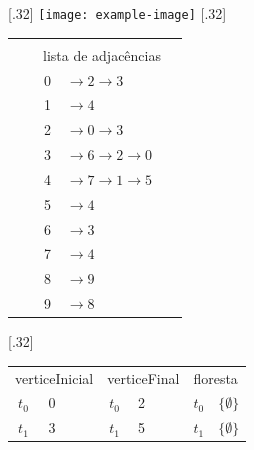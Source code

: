 \documentclass[12pt]{article}
\begin{document}
\begin{figure}
\centering
\subcaptionbox{}[.32\textwidth]
  {\resizebox{0.3\textwidth}{!}
		  {\texttt{[image: example-image]}}}
\subcaptionbox{}[.32\textwidth]
  {\resizebox{0.2122\textwidth}{!}
		  {\begin{tabular}{llcllllllll}
 &  & \multicolumn{1}{l}{} &  &  &  &  &  &  &  &  \\
 &  & \multicolumn{8}{l}{lista de adjacências} &  \\ \cline{3-3}
 & \multicolumn{1}{l|}{} & \multicolumn{1}{c|}{0} & \multicolumn{7}{l}{$\to2\to3$} &  \\ \cline{3-3}
 & \multicolumn{1}{l|}{} & \multicolumn{1}{c|}{1} & \multicolumn{7}{l}{$\to4$} &  \\ \cline{3-3}
 & \multicolumn{1}{l|}{} & \multicolumn{1}{c|}{2} & \multicolumn{7}{l}{$\to0\to3$} &  \\ \cline{3-3}
 & \multicolumn{1}{l|}{} & \multicolumn{1}{c|}{3} & \multicolumn{7}{l}{$\to6\to2\to0$} &  \\ \cline{3-3}
 & \multicolumn{1}{l|}{} & \multicolumn{1}{c|}{4} & \multicolumn{7}{l}{$\to7\to1\to5$} &  \\ \cline{3-3}
 & \multicolumn{1}{l|}{} & \multicolumn{1}{c|}{5} & \multicolumn{7}{l}{$\to4$} &  \\ \cline{3-3}
 & \multicolumn{1}{l|}{} & \multicolumn{1}{c|}{6} & \multicolumn{7}{l}{$\to3$} &  \\ \cline{3-3}
 & \multicolumn{1}{l|}{} & \multicolumn{1}{c|}{7} & \multicolumn{7}{l}{$\to4$} &  \\ \cline{3-3}
 & \multicolumn{1}{l|}{} & \multicolumn{1}{c|}{8} & \multicolumn{7}{l}{$\to9$} &  \\ \cline{3-3}
 & \multicolumn{1}{l|}{} & \multicolumn{1}{c|}{9} & \multicolumn{7}{l}{$\to8$} &  \\ \cline{3-3}
\end{tabular}}}
\subcaptionbox{}[.32\textwidth]
  {		  \resizebox{0.3\textwidth}{!}
		  {
				\begin{tabular}{ccccccccccc}
				\multicolumn{4}{l}{verticeInicial} & \multicolumn{4}{l}{verticeFinal} & \multicolumn{3}{l}{floresta} \\ \cline{2-2} \cline{6-6} \cline{10-11} 
				\multicolumn{1}{c|}{$t_0$} & \multicolumn{1}{c|}{0} &  &  & \multicolumn{1}{c|}{$t_0$} & \multicolumn{1}{c|}{2} &  &  & \multicolumn{1}{c|}{$t_0$} & \multicolumn{2}{c|}{$\{\emptyset\}$} \\ \cline{2-2} \cline{6-6} \cline{10-11} 
				\multicolumn{1}{c|}{$t_1$} & \multicolumn{1}{c|}{3} &  &  & \multicolumn{1}{c|}{$t_1$} & \multicolumn{1}{c|}{5} &  &  & \multicolumn{1}{c|}{$t_1$} & \multicolumn{2}{c|}{$\{\emptyset\}$} \\ \cline{2-2} \cline{6-6} \cline{10-11} 

\end{tabular}}}
\end{figure}
\end{document}
